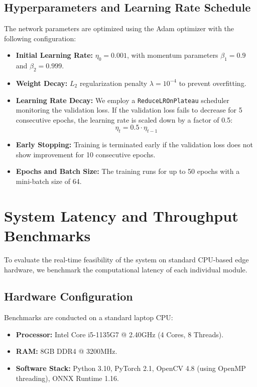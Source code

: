 \subsection{Hyperparameters and Learning Rate Schedule}
The network parameters are optimized using the Adam optimizer with the following configuration:
\begin{itemize}
    \item \textbf{Initial Learning Rate:} $\eta_0 = 0.001$, with momentum parameters $\beta_1 = 0.9$ and $\beta_2 = 0.999$.
    \item \textbf{Weight Decay:} $L_2$ regularization penalty $\lambda = 10^{-4}$ to prevent overfitting.
    \item \textbf{Learning Rate Decay:} We employ a \texttt{ReduceLROnPlateau} scheduler monitoring the validation loss. If the validation loss fails to decrease for 5 consecutive epochs, the learning rate is scaled down by a factor of 0.5:
    \begin{equation}
        \eta_{t} = 0.5 \cdot \eta_{t-1}
    \end{equation}
    \item \textbf{Early Stopping:} Training is terminated early if the validation loss does not show improvement for 10 consecutive epochs.
    \item \textbf{Epochs and Batch Size:} The training runs for up to 50 epochs with a mini-batch size of 64.
\end{itemize}

\section{System Latency and Throughput Benchmarks}
To evaluate the real-time feasibility of the system on standard CPU-based edge hardware, we benchmark the computational latency of each individual module.

\subsection{Hardware Configuration}
Benchmarks are conducted on a standard laptop CPU:
\begin{itemize}
    \item \textbf{Processor:} Intel Core i5-1135G7 @ 2.40GHz (4 Cores, 8 Threads).
    \item \textbf{RAM:} 8GB DDR4 @ 3200MHz.
    \item \textbf{Software Stack:} Python 3.10, PyTorch 2.1, OpenCV 4.8 (using OpenMP threading), ONNX Runtime 1.16.
\end{itemize}

